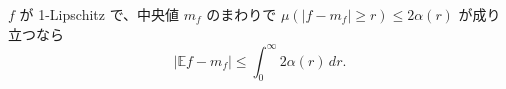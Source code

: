 $f$ が 1-Lipschitz で、中央値 $m_f$ のまわりで $\mu(|f - m_f| \ge r) \le 2\alpha(r)$ が成り立つなら
\[
  |\mathbb{E} f - m_f| \le \int_0^\infty 2\alpha(r)\, dr.
\]
